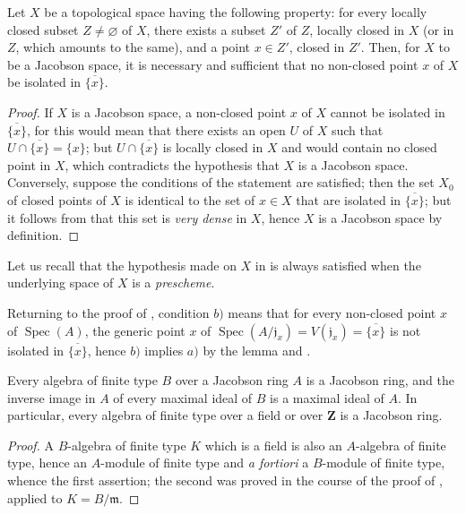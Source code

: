 \begin{lemma}[10.4.5.1]
\label{IV.10.4.5.1}
Let $X$ be a topological space having the following property: for every locally closed subset $Z\neq\varnothing$ of $X$, there exists a subset $Z'$ of $Z$, locally closed in $X$ (or in $Z$, which amounts to the same), and a point $x\in Z'$, closed in $Z'$.
Then, for $X$ to be a Jacobson space, it is necessary and sufficient that no non-closed point $x$ of $X$ be isolated in $\overline{\{x\}}$.
\end{lemma}

\begin{proof}
If $X$ is a Jacobson space, a non-closed point $x$ of $X$ cannot be isolated in $\overline{\{x\}}$, for this would mean that there exists an open $U$ of $X$ such that $U\cap\overline{\{x\}}=\{x\}$; but $U\cap\overline{\{x\}}$ is locally closed in $X$ and would contain no closed point in $X$, which contradicts the hypothesis that $X$ is a Jacobson space.
Conversely, suppose the conditions of the statement are satisfied; then the set $X_0$ of closed points of $X$ is identical to the set of $x\in X$ that are isolated in $\overline{\{x\}}$; but it follows from  that
this set is \emph{very dense} in $X$, hence $X$ is a Jacobson space by definition.
\end{proof}

Let us recall  that the hypothesis made on $X$ in  is always satisfied when the underlying space of $X$ is a \emph{prescheme}.

Returning to the proof of , condition $b)$ means that for every non-closed point $x$ of $\operatorname{Spec}(A)$, the generic point $x$ of $\operatorname{Spec}(A/\mathfrak{j}_x)=V(\mathfrak{j}_x)=\overline{\{x\}}$ is not isolated in $\overline{\{x\}}$, hence $b)$ implies $a)$ by the lemma  and .

\begin{corollary}[10.4.6]
\label{IV.10.4.6}
Every algebra of finite type $B$ over a Jacobson ring $A$ is a Jacobson ring, and the inverse image in $A$ of every maximal ideal of $B$ is a maximal ideal of $A$.
In particular, every algebra of finite type over a field or over $\mathbf{Z}$ is a Jacobson ring.
\end{corollary}

\begin{proof}
A $B$-algebra of finite type $K$ which is a field is also an $A$-algebra of finite type, hence an $A$-module of finite type and \emph{a fortiori} a $B$-module of finite type, whence the first assertion; the second was proved in the course of the proof of , applied to $K=B/\mathfrak{m}$.
\end{proof}


